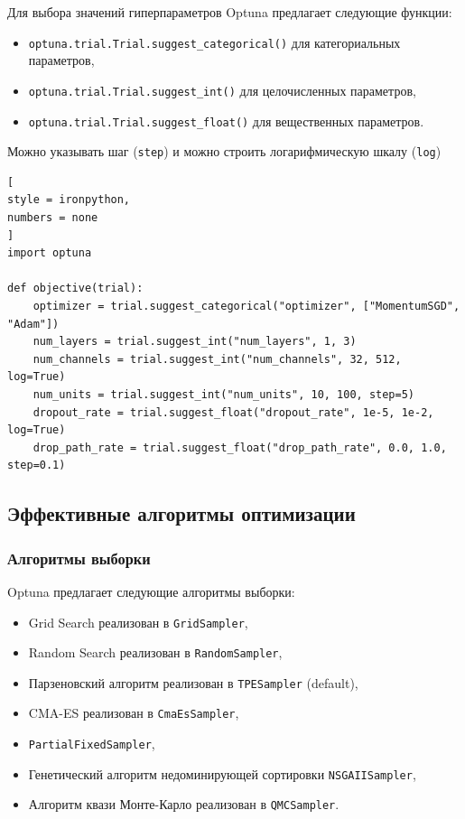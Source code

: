 \documentclass[%
	11pt,
	a4paper,
	utf8,
		]{article}
\begin{document}
Для выбора значений гиперпараметров Optuna предлагает следующие функции:
\begin{itemize}
	\item \verb|optuna.trial.Trial.suggest_categorical()| для категориальных параметров,
	
	\item \verb|optuna.trial.Trial.suggest_int()| для целочисленных параметров,
	
	\item \verb|optuna.trial.Trial.suggest_float()| для вещественных параметров.
\end{itemize}

Можно указывать шаг (\verb|step|) и можно строить логарифмическую шкалу (\verb|log|)
\begin{lstlisting}[
style = ironpython,
numbers = none	
]
import optuna

def objective(trial):
    optimizer = trial.suggest_categorical("optimizer", ["MomentumSGD", "Adam"])
    num_layers = trial.suggest_int("num_layers", 1, 3)
    num_channels = trial.suggest_int("num_channels", 32, 512, log=True)
    num_units = trial.suggest_int("num_units", 10, 100, step=5)
    dropout_rate = trial.suggest_float("dropout_rate", 1e-5, 1e-2, log=True)
    drop_path_rate = trial.suggest_float("drop_path_rate", 0.0, 1.0, step=0.1)
\end{lstlisting}

\subsection{Эффективные алгоритмы оптимизации}

\subsubsection{Алгоритмы выборки}

Optuna предлагает следующие алгоритмы выборки:
\begin{itemize}
	\item Grid Search реализован в \verb|GridSampler|,
	
	\item Random Search реализован в \verb|RandomSampler|,
	
	\item Парзеновский алгоритм реализован в \verb|TPESampler| (default),
	
	\item CMA-ES реализован в \verb|CmaEsSampler|,
	
	\item \verb|PartialFixedSampler|,
	
	\item Генетический алгоритм недоминирующей сортировки \verb|NSGAIISampler|,
	
	\item Алгоритм квази Монте-Карло реализован в \verb|QMCSampler|.
\end{itemize}
\end{document}
